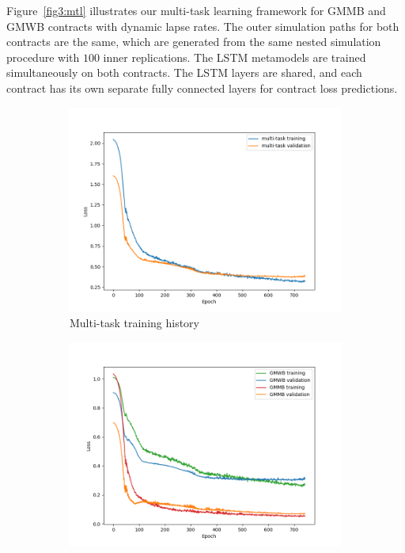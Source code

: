 Figure~\ref{fig3:mtl} illustrates our multi-task learning framework for GMMB and GMWB contracts with dynamic lapse rates.
The outer simulation paths for both contracts are the same, which are generated from the same nested simulation procedure with $100$ inner replications.
The LSTM metamodels are trained simultaneously on both contracts.
The LSTM layers are shared, and each contract has its own separate fully connected layers for contract loss predictions.

\begin{figure}[ht!]
    \centering
    \begin{subfigure}{0.48\textwidth}
        \includegraphics[width=\textwidth]{./project3/figures/figure5a.png}
        \caption{Multi-task training history} 
        \label{subfig3-5:multiTask}
    \end{subfigure}\hfill
    \begin{subfigure}{0.48\textwidth}
        \includegraphics[width=\textwidth]{./project3/figures/figure5b.png}

\end{subfigure}
\end{figure}
